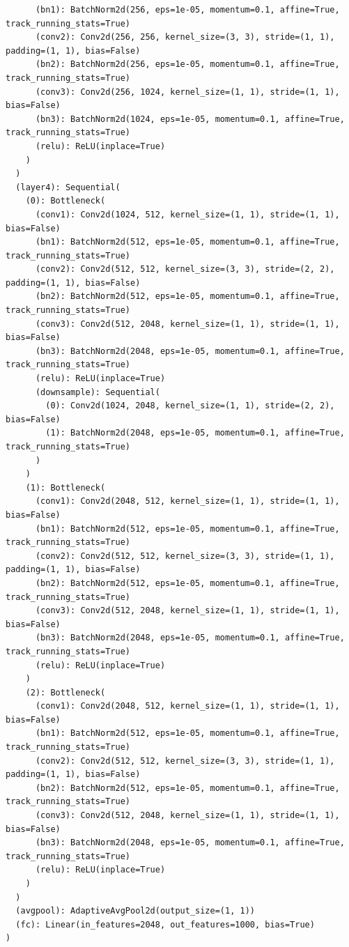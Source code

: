 \documentclass{article}
\begin{document}
\begin{verbatim}
      (bn1): BatchNorm2d(256, eps=1e-05, momentum=0.1, affine=True, track_running_stats=True)
      (conv2): Conv2d(256, 256, kernel_size=(3, 3), stride=(1, 1), padding=(1, 1), bias=False)
      (bn2): BatchNorm2d(256, eps=1e-05, momentum=0.1, affine=True, track_running_stats=True)
      (conv3): Conv2d(256, 1024, kernel_size=(1, 1), stride=(1, 1), bias=False)
      (bn3): BatchNorm2d(1024, eps=1e-05, momentum=0.1, affine=True, track_running_stats=True)
      (relu): ReLU(inplace=True)
    )
  )
  (layer4): Sequential(
    (0): Bottleneck(
      (conv1): Conv2d(1024, 512, kernel_size=(1, 1), stride=(1, 1), bias=False)
      (bn1): BatchNorm2d(512, eps=1e-05, momentum=0.1, affine=True, track_running_stats=True)
      (conv2): Conv2d(512, 512, kernel_size=(3, 3), stride=(2, 2), padding=(1, 1), bias=False)
      (bn2): BatchNorm2d(512, eps=1e-05, momentum=0.1, affine=True, track_running_stats=True)
      (conv3): Conv2d(512, 2048, kernel_size=(1, 1), stride=(1, 1), bias=False)
      (bn3): BatchNorm2d(2048, eps=1e-05, momentum=0.1, affine=True, track_running_stats=True)
      (relu): ReLU(inplace=True)
      (downsample): Sequential(
        (0): Conv2d(1024, 2048, kernel_size=(1, 1), stride=(2, 2), bias=False)
        (1): BatchNorm2d(2048, eps=1e-05, momentum=0.1, affine=True, track_running_stats=True)
      )
    )
    (1): Bottleneck(
      (conv1): Conv2d(2048, 512, kernel_size=(1, 1), stride=(1, 1), bias=False)
      (bn1): BatchNorm2d(512, eps=1e-05, momentum=0.1, affine=True, track_running_stats=True)
      (conv2): Conv2d(512, 512, kernel_size=(3, 3), stride=(1, 1), padding=(1, 1), bias=False)
      (bn2): BatchNorm2d(512, eps=1e-05, momentum=0.1, affine=True, track_running_stats=True)
      (conv3): Conv2d(512, 2048, kernel_size=(1, 1), stride=(1, 1), bias=False)
      (bn3): BatchNorm2d(2048, eps=1e-05, momentum=0.1, affine=True, track_running_stats=True)
      (relu): ReLU(inplace=True)
    )
    (2): Bottleneck(
      (conv1): Conv2d(2048, 512, kernel_size=(1, 1), stride=(1, 1), bias=False)
      (bn1): BatchNorm2d(512, eps=1e-05, momentum=0.1, affine=True, track_running_stats=True)
      (conv2): Conv2d(512, 512, kernel_size=(3, 3), stride=(1, 1), padding=(1, 1), bias=False)
      (bn2): BatchNorm2d(512, eps=1e-05, momentum=0.1, affine=True, track_running_stats=True)
      (conv3): Conv2d(512, 2048, kernel_size=(1, 1), stride=(1, 1), bias=False)
      (bn3): BatchNorm2d(2048, eps=1e-05, momentum=0.1, affine=True, track_running_stats=True)
      (relu): ReLU(inplace=True)
    )
  )
  (avgpool): AdaptiveAvgPool2d(output_size=(1, 1))
  (fc): Linear(in_features=2048, out_features=1000, bias=True)
)
\end{verbatim}
\end{document}
